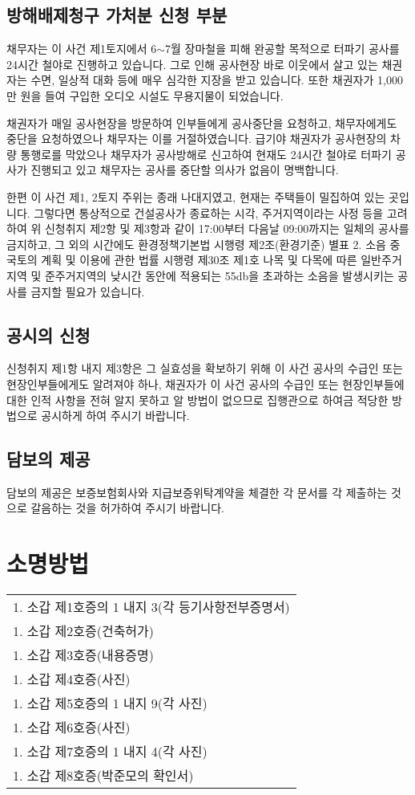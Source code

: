 \documentclass[12pt]{oblivoir}
\begin{document}
\section{방해배제청구 가처분 신청 부분}
채무자는 이 사건 제1토지에서 6$\sim$7월 장마철을 피해 완공할 목적으로 터파기 공사를 24시간 철야로 진행하고 있습니다. 그로 인해 공사현장 바로 이웃에서 살고 있는 채권자는 수면, 일상적 대화 등에 매우 심각한 지장을 받고 있습니다. 또한 채권자가 1,000만 원을 들여 구입한 오디오 시설도 무용지물이 되었습니다.\par
채권자가 매일 공사현장을 방문하여 인부들에게 공사중단을 요청하고, 채무자에게도 중단을 요청하였으나 채무자는 이를 거절하였습니다. 급기야 채권자가 공사현장의 차량 통행로를 막았으나 채무자가 공사방해로 신고하여 현재도 24시간 철야로 터파기 공사가 진행되고 있고 채무자는 공사를 중단할 의사가 없음이 명백합니다.\par
한편 이 사건 제1, 2토지 주위는 종래 나대지였고, 현재는 주택들이 밀집하여 있는 곳입니다. 그렇다면 통상적으로 건설공사가 종료하는 시각, 주거지역이라는 사정 등을 고려하여 위 신청취지 제2항 및 제3항과 같이 17:00부터 다음날 09:00까지는 일체의 공사를 금지하고, 그 외의 시간에도 환경정책기본법 시행령 제2조(환경기준) 별표 2. 소음 중 국토의 계획 및 이용에 관한 법률 시행령 제30조 제1호 나목 및 다목에 따른 일반주거지역 및 준주거지역의 낮시간 동안에 적용되는 55\si{\decibel}을 초과하는 소음을 발생시키는 공사를 금지할 필요가 있습니다.
\section{공시의 신청}
신청취지 제1항 내지 제3항은 그 실효성을 확보하기 위해 이 사건 공사의 수급인 또는 현장인부들에게도 알려져야 하나, 채권자가 이 사건 공사의 수급인 또는 현장인부들에 대한 인적 사항을 전혀 알지 못하고 알 방법이 없으므로 집행관으로 하여금 적당한 방법으로 공시하게 하여 주시기 바랍니다.
\section{담보의 제공}
담보의 제공은 보증보험회사와 지급보증위탁계약을 체결한 각 문서를 각 제출하는 것으로 갈음하는 것을 허가하여 주시기 바랍니다.
\vspace{5em}
\chapter*{\normalfont\normalsize 소명방법}
\begin{longtabu} to \linewidth{X}
    1. 소갑 제1호증의 1 내지 3(각 등기사항전부증명서)\\
    1. 소갑 제2호증(건축허가)\\
    1. 소갑 제3호증(내용증명)\\
    1. 소갑 제4호증(사진)\\
    1. 소갑 제5호증의 1 내지 9(각 사진)\\
    1. 소갑 제6호증(사진)\\
    1. 소갑 제7호증의 1 내지 4(각 사진)\\
    1. 소갑 제8호증(박준모의 확인서)
  \end{longtabu}
\vspace{5em}
\end{document}
